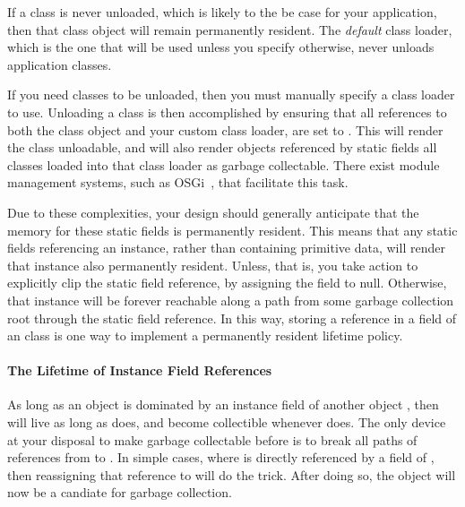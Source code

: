 If a class is never unloaded, which is likely to the be case for your
application, then that class object will remain permanently resident. The
\emph{default} class loader, which is the one that will be used unless you
specify otherwise, never unloads application classes. 

If you need classes to be unloaded, then you must manually specify a class loader
to use. Unloading a class is then accomplished by ensuring that all references to
both the class object and your custom class loader, are set to . This
will render the class unloadable, and will also render objects referenced by
static fields all classes loaded into that class loader as garbage collectable.
There exist module management systems, such as OSGi~\cite{OSGi_2007}, that
facilitate this task.

Due to these complexities, your design should generally anticipate that the
memory for these static fields is permanently resident. This means that any
static fields referencing an instance, rather than containing primitive data,
will render that instance also permanently resident. Unless, that is, you take
action to explicitly clip the static field reference, by assigning the field to
null. Otherwise, that instance will be forever reachable along a path from some
garbage collection root through the static field reference. In this way, storing
a reference in a  field of an class is one way to implement a
permanently resident lifetime policy.

\paragraph{The Lifetime of Instance Field References}

As long as an object  is dominated by an instance field of another
object , then  will live as long as  does, and become
collectible whenever  does. The only device at your disposal to make
 garbage collectable before  is to break all paths of references
from  to . In simple cases, where  is directly
referenced by a field of , then reassigning that reference to
 will do the trick. After doing so, the  object will now be a
candiate for garbage collection.












